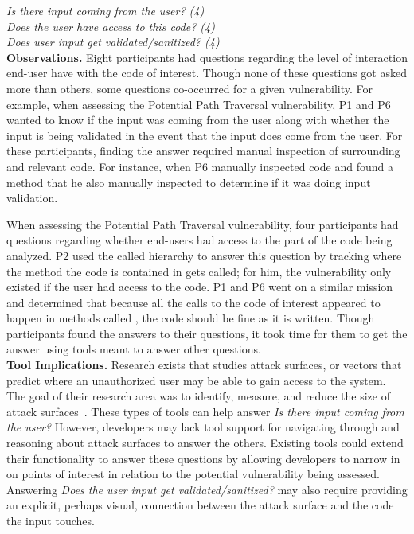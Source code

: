 \documentclass[conference]{IEEEtran}
\begin{document}
\noindent\emph{Is there input coming from the user? (4)} \\
\emph{Does the user have access to this code? (4)} \\
\emph{Does user input get validated/sanitized? (4)} \\


\noindent\textbf{Observations.}
Eight participants had questions regarding the level of interaction end-user have with the code of interest. 
Though none of these questions got asked more than others, some questions co-occurred for a given vulnerability.
For example, when assessing the Potential Path Traversal vulnerability, P1 and P6 wanted to know if the input was coming from the user along with whether the input is being validated in the event that the input does come from the user.
For these participants, finding the answer required manual inspection of surrounding and relevant code. 
For instance, when P6 manually inspected code and found a  method that he also manually inspected to determine if it was doing input validation.

When assessing the Potential Path Traversal vulnerability, four participants had questions regarding whether end-users had access to the part of the code being analyzed.
P2 used the called hierarchy to answer this question by tracking where the method the code is contained in gets called; for him, the vulnerability only existed if the user had access to the code.
P1 and P6 went on a similar mission and determined that because all the calls to the code of interest appeared to happen in methods called , the code should be fine as it is written.
Though participants found the answers to their questions, it took time for them to get the answer using tools meant to answer other questions.
\\

\noindent\textbf{Tool Implications.}
Research exists that studies attack surfaces, or vectors that predict where an unauthorized user may be able to gain access to the system.
The goal of their research area was to identify, measure, and reduce the size of attack surfaces~\cite{manadhata2011attack, bartel2012automatically}. These types of tools can help answer \textit{Is there input coming from the user?} 
However, developers may lack tool support for navigating through and reasoning about attack surfaces to answer the others.
Existing tools could extend their functionality to answer these questions by allowing developers to narrow in on points of interest in relation to the potential vulnerability being assessed.
Answering \textit{Does the user input get validated/sanitized?} may also require providing an explicit, perhaps visual, connection between the attack surface and the code the input touches.
\end{document}
